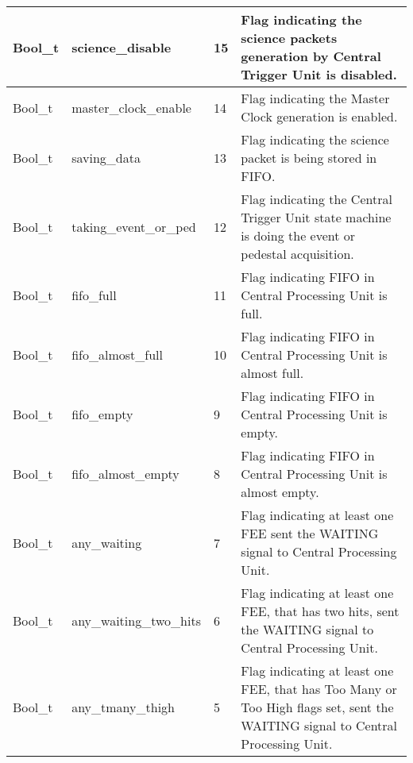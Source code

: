 \documentclass[a4paper, 12pt, onecolumn]{article}
\begin{document}
\newpage

\begin{center}
  \label{tab:trigg-status-bit}    
  \tablelasttail{\hline}
  \begin{supertabular}{| p{15mm} | p{37mm} | p{7mm} | p{60mm} |}
    Bool\_t   & science\_disable        & 15  & Flag indicating the science packets generation by Central Trigger Unit is disabled. \\\hline
    Bool\_t   & master\_clock\_enable   & 14  & Flag indicating the Master Clock generation is enabled. \\\hline
    Bool\_t   & saving\_data            & 13  & Flag indicating the science packet is being stored in FIFO. \\\hline
    Bool\_t   & taking\_event\_or\_ped  & 12  & Flag indicating the Central Trigger Unit state machine is doing the event or pedestal acquisition. \\\hline
    Bool\_t   & fifo\_full              & 11  & Flag indicating FIFO in Central Processing Unit is full. \\\hline
    Bool\_t   & fifo\_almost\_full      & 10  & Flag indicating FIFO in Central Processing Unit is almost full. \\\hline
    Bool\_t   & fifo\_empty             & 9   & Flag indicating FIFO in Central Processing Unit is empty. \\\hline
    Bool\_t   & fifo\_almost\_empty     & 8   & Flag indicating FIFO in Central Processing Unit is almost empty. \\\hline
    Bool\_t   & any\_waiting            & 7   & Flag indicating at least one FEE sent the WAITING signal to Central Processing Unit. \\\hline
    Bool\_t   & any\_waiting\_two\_hits & 6   & Flag indicating at least one FEE, that has two hits, sent the WAITING signal to Central Processing Unit. \\\hline
    Bool\_t   & any\_tmany\_thigh       & 5   & Flag indicating at least one FEE, that has Too Many or Too High flags set, sent the WAITING signal to Central Processing Unit. \\\hline

\end{supertabular}
\end{center}
\end{document}
